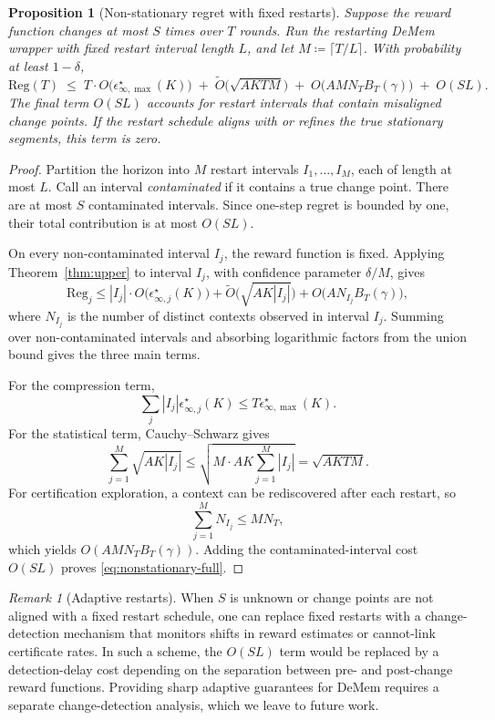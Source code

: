 \documentclass{article}
\theoremstyle{plain}
\newtheorem{proposition}{Proposition}
\theoremstyle{definition}
\theoremstyle{remark}
\newtheorem{remark}{Remark}
\newcommand{\eps}{\epsilon}
\newcommand{\Reg}{\mathrm{Reg}}
\begin{document}
\begin{proposition}[Non-stationary regret with fixed restarts]
\label{prop:nonstationary}
Suppose the reward function changes at most \(S\) times over \(T\) rounds.
Run the restarting DeMem wrapper with fixed restart interval length
\(L\), and let \(M\coloneqq\lceil T/L\rceil\). With probability at least
\(1-\delta\),
\begin{equation}
\label{eq:nonstationary-full}
\Reg(T)
\;\le\;
T\cdot O\!\bigl(\eps^\star_{\infty,\max}(K)\bigr)
\;+\;
\tilde O\!\bigl(\sqrt{AKTM}\bigr)
\;+\;
O\!\bigl(A M N_T B_T(\gamma)\bigr)
\;+\;
O(SL).
\end{equation}
The final term \(O(SL)\) accounts for restart intervals that contain
misaligned change points. If the restart schedule aligns with or refines the
true stationary segments, this term is zero.
\end{proposition}

\begin{proof}
Partition the horizon into \(M\) restart intervals
\(I_1,\dots,I_M\), each of length at most \(L\). Call an interval
\emph{contaminated} if it contains a true change point. There are at most
\(S\) contaminated intervals. Since one-step regret is bounded by one, their
total contribution is at most \(O(SL)\).

On every non-contaminated interval \(I_j\), the reward function is fixed.
Applying Theorem~\ref{thm:upper} to interval \(I_j\), with confidence
parameter \(\delta/M\), gives
\[
\Reg_j
\le
|I_j|\cdot O\!\bigl(\eps^\star_{\infty,j}(K)\bigr)
+
\tilde O\!\bigl(\sqrt{AK|I_j|}\bigr)
+
O\!\bigl(A N_{I_j} B_T(\gamma)\bigr),
\]
where \(N_{I_j}\) is the number of distinct contexts observed in interval
\(I_j\). Summing over non-contaminated intervals and absorbing logarithmic
factors from the union bound gives the three main terms.

For the compression term,
\[
\sum_j |I_j|\eps^\star_{\infty,j}(K)
\le
T\eps^\star_{\infty,\max}(K).
\]
For the statistical term, Cauchy--Schwarz gives
\[
\sum_{j=1}^{M}\sqrt{AK|I_j|}
\le
\sqrt{M\cdot AK\sum_{j=1}^{M}|I_j|}
=
\sqrt{AKTM}.
\]
For certification exploration, a context can be rediscovered after each
restart, so
\[
\sum_{j=1}^{M} N_{I_j}\le M N_T,
\]
which yields \(O(A M N_T B_T(\gamma))\). Adding the contaminated-interval
cost \(O(SL)\) proves \eqref{eq:nonstationary-full}.
\end{proof}

\begin{remark}[Adaptive restarts]
\label{rem:adaptive-restart}
When \(S\) is unknown or change points are not aligned with a fixed restart
schedule, one can replace fixed restarts with a change-detection mechanism
that monitors shifts in reward estimates or cannot-link certificate rates.
In such a scheme, the \(O(SL)\) term would be replaced by a detection-delay
cost depending on the separation between pre- and post-change reward
functions. Providing sharp adaptive guarantees for DeMem requires a
separate change-detection analysis, which we leave to future work.
\end{remark}
\end{document}
